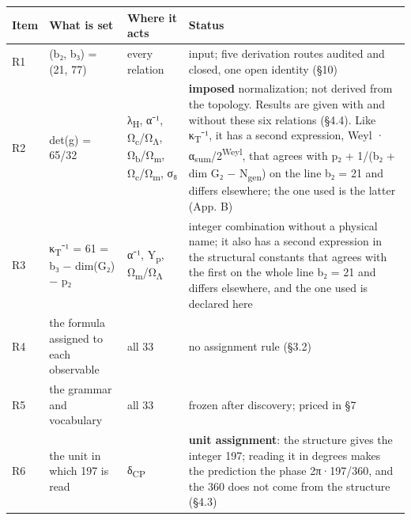 \documentclass[11pt,a4paper]{article}
\begin{document}
\begin{longtable}[]{@{}
  >{\raggedright\arraybackslash}p{}
  >{\raggedright\arraybackslash}p{}
  >{\raggedright\arraybackslash}p{}
  >{\raggedright\arraybackslash}p{}@{}}
\toprule\noalign{}
\begin{minipage}[b]{\linewidth}\raggedright
Item
\end{minipage} & \begin{minipage}[b]{\linewidth}\raggedright
What is set
\end{minipage} & \begin{minipage}[b]{\linewidth}\raggedright
Where it acts
\end{minipage} & \begin{minipage}[b]{\linewidth}\raggedright
Status
\end{minipage} \\
\midrule\noalign{}
\endhead
\bottomrule\noalign{}
\endlastfoot
R1 & (b₂, b₃) = (21, 77) & every relation & input; five derivation routes audited and closed, one open identity (§10) \\
R2 & det(g) = 65/32 & λ\textsubscript{H}, α⁻¹, Ω\textsubscript{c}/Ω\textsubscript{Λ}, Ω\textsubscript{b}/Ω\textsubscript{m}, Ω\textsubscript{c}/Ω\textsubscript{m}, σ₈ & \textbf{imposed} normalization; not derived from the topology. Results are given with and without these six relations (§4.4). Like κ\textsubscript{T}⁻¹, it has a second expression, Weyl · α\textsubscript{sum}/2\textsuperscript{Weyl}, that agrees with p₂ + 1/(b₂ + dim G₂ − N\textsubscript{gen}) on the line b₂ = 21 and differs elsewhere; the one used is the latter (App. B) \\
R3 & κ\textsubscript{T}⁻¹ = 61 = b₃ − dim(G₂) − p₂ & α⁻¹, Y\textsubscript{p}, Ω\textsubscript{m}/Ω\textsubscript{Λ} & integer combination without a physical name; it also has a second expression in the structural constants that agrees with the first on the whole line b₂ = 21 and differs elsewhere, and the one used is declared here \\
R4 & the formula assigned to each observable & all 33 & no assignment rule (§3.2) \\
R5 & the grammar and vocabulary & all 33 & frozen after discovery; priced in §7 \\
R6 & the unit in which 197 is read & δ\textsubscript{CP} & \textbf{unit assignment}: the structure gives the integer 197; reading it in degrees makes the prediction the phase 2π·197/360, and the 360 does not come from the structure (§4.3) \\

\end{longtable}
\end{document}
